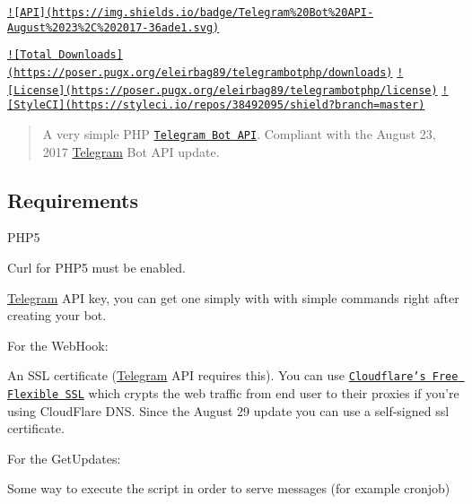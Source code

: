 \href{https://core.telegram.org/bots/api}{\tt !\mbox{[}A\-P\-I\mbox{]}(https\-://img.\-shields.\-io/badge/\-Telegram\%20\-Bot\%20\-A\-P\-I-\/\-August\%2023\%2\-C\%202017-\/36ade1.\-svg)}  

\href{https://packagist.org/packages/eleirbag89/telegrambotphp}{\tt !\mbox{[}Total Downloads\mbox{]}(https\-://poser.\-pugx.\-org/eleirbag89/telegrambotphp/downloads)} \href{https://packagist.org/packages/eleirbag89/telegrambotphp}{\tt !\mbox{[}License\mbox{]}(https\-://poser.\-pugx.\-org/eleirbag89/telegrambotphp/license)} \href{https://styleci.io/repos/38492095}{\tt !\mbox{[}Style\-C\-I\mbox{]}(https\-://styleci.\-io/repos/38492095/shield?branch=master)}

\begin{quotation}
A very simple P\-H\-P \href{https://core.telegram.org/bots}{\tt Telegram Bot A\-P\-I}. Compliant with the August 23, 2017 \hyperlink{class_telegram}{Telegram} Bot A\-P\-I update.

\end{quotation}


\subsection*{Requirements }


\begin{DoxyItemize}
\item P\-H\-P5
\item Curl for P\-H\-P5 must be enabled.
\item \hyperlink{class_telegram}{Telegram} A\-P\-I key, you can get one simply with \href{https://core.telegram.org/bots#botfather}{\tt } with simple commands right after creating your bot.
\end{DoxyItemize}

For the Web\-Hook\-:
\begin{DoxyItemize}
\item An S\-S\-L certificate (\hyperlink{class_telegram}{Telegram} A\-P\-I requires this). You can use \href{https://www.cloudflare.com/ssl}{\tt Cloudflare's Free Flexible S\-S\-L} which crypts the web traffic from end user to their proxies if you're using Cloud\-Flare D\-N\-S. Since the August 29 update you can use a self-\/signed ssl certificate.
\end{DoxyItemize}

For the Get\-Updates\-:
\begin{DoxyItemize}
\item Some way to execute the script in order to serve messages (for example cronjob)
\end{DoxyItemize}

